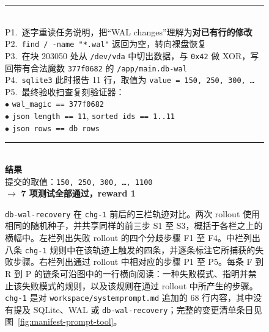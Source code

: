 \begin{figure}[t]
\begin{tcbraster}
\begin{tcolorbox}[colback=aheTeal!12,colframe=aheBlue,colbacktitle=aheBlue,
                          title={\scriptsize\textbf{\texttt{chg-1} 之后，相同种子，迭代 2，reward 1.0}}]
            \rule{\linewidth}{0.3pt}\\[1pt]
            P1.~逐字重读任务说明，把``WAL changes''理解为\textbf{对已有行的修改} \\[2pt]
            P2.~\texttt{find / -name "*.wal"} 返回为空，转向裸盘恢复 \\[2pt]
            P3.~在块 203050 处从 \texttt{/dev/vda} 中切出数据，与 \texttt{0x42} 做 XOR，写回带有合法魔数 \texttt{377f0682} 的 \texttt{/app/main.db-wal} \\[2pt]
            P4.~\texttt{sqlite3} 此时报告 11 行，取值为 \texttt{value = 150, 250, 300, \dots} \\[2pt]
            P5.~最终验收扫查复刻验证器： \\
            \phantom{P5.~}$\bullet$ \texttt{wal\_magic == 377f0682} \\
            \phantom{P5.~}$\bullet$ \texttt{json length == 11}, \texttt{sorted ids == 1..11} \\
            \phantom{P5.~}$\bullet$ \texttt{json rows == db rows} \\[3pt]
            \rule{\linewidth}{0.3pt}\\
            \textbf{\textcolor{aheBlue}{结果}} \\
            提交的取值：\texttt{150, 250, 300, \dots, 1100} \\
            $\rightarrow$ \textbf{7 项测试全部通过，reward 1}
        \end{tcolorbox}
    \end{tcbraster}
    \caption{\texttt{db-wal-recovery} 在 \texttt{chg-1} 前后的三栏轨迹对比。两次 rollout 使用相同的随机种子，并共享同样的前三步 S1 至 S3，概括于各栏之上的横幅中。左栏列出失败 rollout 的四个分歧步骤 F1 至 F4。中栏列出八条 \texttt{chg-1} 规则中在该轨迹上触发的四条，并逐条标注它所捕获的失败步骤。右栏列出通过 rollout 中相对应的步骤 P1 至 P5。每条 F 到 R 到 P 的链条可沿图中的一行横向阅读：一种失败模式、指明并禁止该失败模式的规则，以及该规则在通过 rollout 中所产生的步骤。\texttt{chg-1} 是对 \texttt{workspace/systemprompt.md} 追加的 68 行内容，其中没有提及 SQLite、WAL 或 \texttt{db-wal-recovery}；完整的变更清单条目见图~\ref{fig:manifest-prompt-tool}。}
    \label{fig:case-trajectory}
\end{figure}
